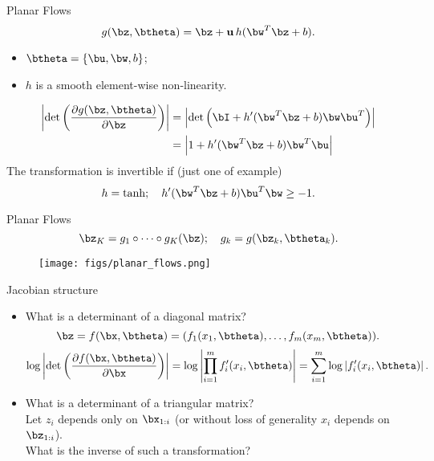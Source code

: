 \begin{frame}{Planar Flows}
	\vspace{-0.2cm}
	\[
	g(\bz, \btheta) = \bz + \mathbf{u} \, h(\bw^T\bz + b).
	\]
	\vspace{-0.2cm}
	\begin{itemize}
		\item $\btheta = \{\bu, \bw, b\}$;
		\item $h$ is a smooth element-wise non-linearity.
	\end{itemize}
	\begin{align*}
		\left| \det \left( \frac{\partial g(\bz, \btheta)}{\partial \bz} \right)\right| &= \left| \det \left( \bI +  h'(\bw^T \bz + b) \bw\bu^T\right) \right| \\
		&= \left| 1 + h'(\bw^T \bz + b) \bw^T \bu \right|
	\end{align*}
	The transformation is invertible if (just one of example)
	\[
	h = \tanh; \quad h'(\bw^T \bz + b) \bu^T \bw \geq -1.
	\]
\end{frame}
\begin{frame}{Planar Flows}
	\[
	\bz_K = g_1 \circ \dots \circ g_K (\bz); \quad g_k = g(\bz_k, \btheta_k).
	\]
	\begin{figure}
		\centering
		\texttt{[image: figs/planar\_flows.png]}
	\end{figure}
\end{frame}
\begin{frame}{Jacobian structure}
	\begin{itemize}
		\item What is a determinant of a diagonal matrix?
		\[
		\bz = f(\bx, \btheta) = (f_1(x_1, \btheta), \dots, f_m(x_m, \btheta)).
		\]
		\[
		\log \left|\det \left( \frac{\partial f(\bx, \btheta)}{\partial \bx} \right) \right| = \log \left| \prod_{i=1}^m f_i'(x_i, \btheta) \right| = \sum_{i=1}^m \log \left| f_i'(x_i, \btheta) \right|.
		\]
		\item What is a determinant of a triangular matrix? \\
		Let $z_i$ depends only on $\bx_{1:i}$ (or without loss of generality $x_i$ depends on $\bz_{1:i}$). \\
		What is the inverse of such a transformation?
	\end{itemize}
\end{frame}
